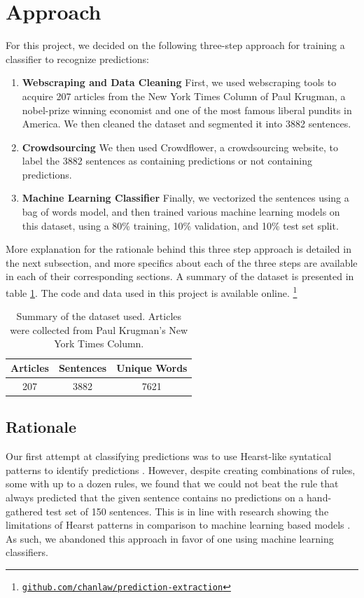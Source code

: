 \documentclass[11pt,letterpaper]{article}
\begin{document}
\section{Approach}
\label{approach}
For this project, we decided on the following three-step approach for training a classifier to recognize predictions:
\begin{enumerate}
\item\textbf{Webscraping and Data Cleaning} First, we used webscraping tools to acquire 207 articles from the New York Times Column of Paul Krugman, a nobel-prize winning economist and one of the most famous liberal pundits in America. We then cleaned the dataset and segmented it into 3882 sentences. 
\item \textbf{Crowdsourcing} We then used Crowdflower, a crowdsourcing website, to label the 3882 sentences as containing predictions or not containing predictions. 
\item \textbf{Machine Learning Classifier} Finally, we vectorized the sentences using a bag of words model, and then trained various machine learning models on this dataset, using a 80\% training, 10\% validation, and 10\% test set split. 
\end{enumerate}
More explanation for the rationale behind this three step approach is detailed in the next subsection, and more specifics about each of the three steps are available in each of their corresponding sections. A summary of the dataset is presented in table \ref{data}. The code and data used in this project is available online. \footnote{\href{https://github.com/chanlaw/prediction-extraction}{\texttt{github.com/chanlaw/prediction-extraction}}} 
\begin{table}
\centering
 \begin{tabular}{|c c c|} 
 \hline
\textbf{Articles} & \textbf{Sentences} & \textbf{Unique Words} \\
 \hline
207 & 3882 & 7621\\
 \hline
 \end{tabular}
 \caption{Summary of the dataset used. Articles were collected from Paul Krugman's New York Times Column.}
 \label{data}
\end{table}
\subsection{Rationale}
Our first attempt at classifying predictions was to use Hearst-like syntatical patterns to identify predictions \cite{Hearst:92}. However, despite creating combinations of rules, some with up to a dozen rules, we found that we could not beat the rule that always predicted that the given sentence contains no predictions on a hand-gathered test set of 150 sentences. This is in line with research showing the limitations of Hearst patterns in comparison to machine learning based models \cite{Snow:04}. As such, we abandoned this approach in favor of one using machine learning classifiers. 
\end{document}
